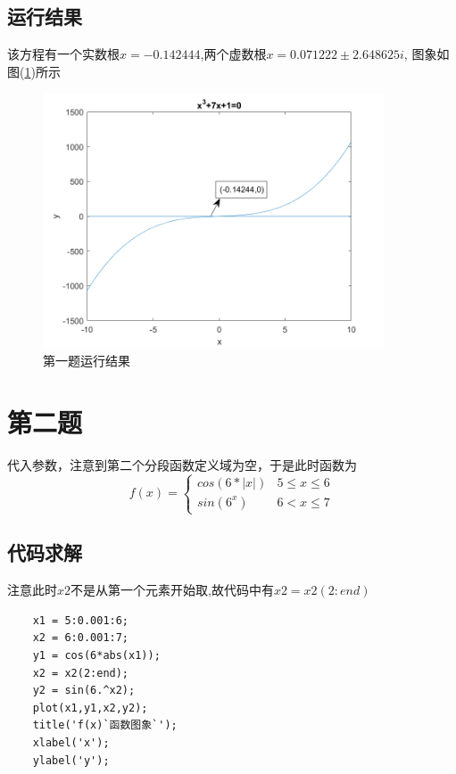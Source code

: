 \documentclass[a4paper,left=2.5cm,right=2.5cm]{article}
\begin{document}
\begin{spacing}{1.6}
	\subsection{运行结果}
	该方程有一个实数根$x=-0.142444$,两个虚数根$x=0.071222\pm2.648625i$,
	图象如图(\ref{sol1})所示
	\begin{figure}[H]
		\includegraphics[width=0.9\textwidth]{image/result_1.png}
		\caption{第一题运行结果}
		\label{sol1}
	\end{figure}
	\section{第二题}
	代入参数，注意到第二个分段函数定义域为空，于是此时函数为
	\begin{equation}
	f(x)=\left\{
	\begin{array}{ll}
	cos(6*|x|)& 5\le x\le 6\\
	sin(6^x)& 6 < x\le 7
	\end{array}
	\right.
	\end{equation}
	\subsection{代码求解}
	注意此时$x2$不是从第一个元素开始取,故代码中有$x2=x2(2:end)$
	\begin{lstlisting}
	x1 = 5:0.001:6;
	x2 = 6:0.001:7;
	y1 = cos(6*abs(x1));
	x2 = x2(2:end);
	y2 = sin(6.^x2);
	plot(x1,y1,x2,y2);
	title('f(x)`函数图象`');
	xlabel('x');
	ylabel('y');
	\end{lstlisting}

\end{spacing}
\end{document}
